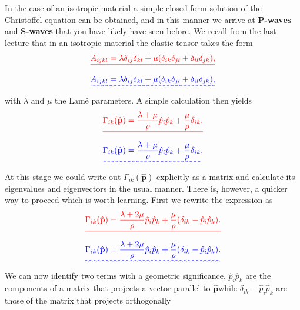 \documentclass [a4paper,12pt]{paper}
\providecommand{\DIFadd}[1]{{\protect\color{blue}\uwave{#1}}} %
\providecommand{\DIFdel}[1]{{\protect\color{red}\sout{#1}}}                      %
\providecommand{\DIFaddbegin}{} %
\providecommand{\DIFaddend}{} %
\providecommand{\DIFdelbegin}{} %
\providecommand{\DIFdelend}{} %
\begin{document}
In the case of an isotropic material a simple closed-form solution of the Christoffel equation can be obtained, and in this manner we arrive at \textbf{P-waves} and \textbf{S-waves} that you have likely \DIFdelbegin \DIFdel{have }\DIFdelend seen before.
 We recall from the last lecture that in an isotropic material the elastic tensor takes the form
\DIFdelbegin \begin{displaymath}
\DIFdel{A_{ijkl}=\lambda\delta_{ij}\delta_{kl}+\mu(\delta_{ik}\delta_{jl}+\delta_{il}\delta_{jk}),
}\end{displaymath}%
\DIFdelend \DIFaddbegin \begin{equation}
\DIFadd{A_{ijkl}=\lambda\delta_{ij}\delta_{kl}+\mu(\delta_{ik}\delta_{jl}+\delta_{il}\delta_{jk}),
\label{eq:21}
}\end{equation}\DIFaddend 
with $\lambda$ and $\mu$ the Lamé parameters. A simple calculation then yields
\DIFdelbegin \begin{displaymath}
\DIFdel{\Gamma_{ik}(\hat{\mathbf{p}})=\frac{\lambda+\mu}{\rho}\hat{p}_{i}\hat{p}_{k}+\frac{\mu}{\rho}\delta_{ik}.
}\end{displaymath}%
\DIFdelend \DIFaddbegin \begin{equation}
\DIFadd{\Gamma_{ik}(\hat{\mathbf{p}})=\frac{\lambda+\mu}{\rho}\hat{p}_{i}\hat{p}_{k}+\frac{\mu}{\rho}\delta_{ik}.
\label{eq:22}
}\end{equation}\DIFaddend 
At this stage we could write out $\Gamma_{ik}(\hat{\mathbf{p}})$ explicitly as a matrix and calculate its eigenvalues and eigenvectors in the usual manner. 
There is, however, a quicker way to proceed which is worth learning. First we rewrite the expression as
\DIFdelbegin \begin{displaymath}
\DIFdel{\Gamma_{ik}(\hat{\mathbf{p}})=\frac{\lambda+2\mu}{\rho}\hat{p}_{i}\hat{p}_{k}+\frac{\mu}{\rho}(\delta_{ik}-\hat{p}_{i}\hat{p}_{k}).
}\end{displaymath}%
\DIFdelend \DIFaddbegin \begin{equation}
\DIFadd{\Gamma_{ik}(\hat{\mathbf{p}})=\frac{\lambda+2\mu}{\rho}\hat{p}_{i}\hat{p}_{k}+\frac{\mu}{\rho}(\delta_{ik}-\hat{p}_{i}\hat{p}_{k}).
\label{eq:23}
}\end{equation}\DIFaddend 
We can now identify two terms with a geometric significance. $\hat{p}_{i}\hat{p}_{k}$ are the components of \DIFdelbegin \DIFdel{a }\DIFdelend \DIFaddbegin \DIFadd{the }\DIFaddend matrix that projects a vector \DIFdelbegin \DIFdel{parallel to }\DIFdelend \DIFaddbegin \DIFadd{onto the direction }\DIFaddend $\hat{\mathbf{p}}$\DIFaddbegin \DIFadd{, }\DIFaddend while $\delta_{ik}-\hat{p}_{i}\hat{p}_{k}$ are those of the matrix that projects orthogonally
\end{document}
